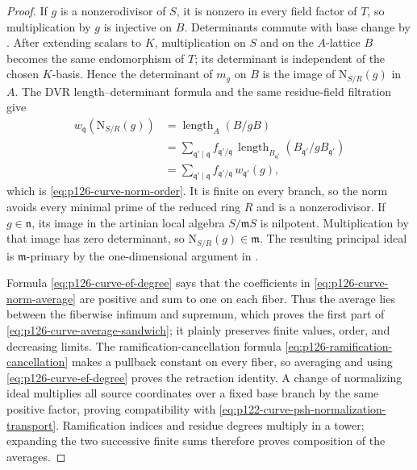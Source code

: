\begin{proof}
If \(g\) is a nonzerodivisor of \(S\), it is nonzero in every field factor
of \(T\), so multiplication by \(g\) is injective on \(B\).  Determinants
commute with base change by .  After
extending scalars to \(K\), multiplication on \(S\) and on the
\(A\)-lattice \(B\) becomes the same endomorphism of \(T\); its determinant
is independent of the chosen \(K\)-basis.  Hence the determinant of
\(m_g\) on \(B\) is the image of \(\mathrm N_{S/R}(g)\) in \(A\).  The DVR length--determinant formula
\cite[\emph{Lengths and determinants}, Tag~02QA]{stacks-project} and the
same residue-field filtration give
\[
 \begin{aligned}
 w_{\mathfrak q}\!\left(\mathrm N_{S/R}(g)\right)
   &=\operatorname{length}_A(B/gB)\\
   &=\sum_{\mathfrak q'\mid\mathfrak q}
       f_{\mathfrak q'/\mathfrak q}\,
       \operatorname{length}_{B_{\mathfrak q'}}
          (B_{\mathfrak q'}/gB_{\mathfrak q'})\\
   &=\sum_{\mathfrak q'\mid\mathfrak q}
       f_{\mathfrak q'/\mathfrak q}\,
       w_{\mathfrak q'}(g),
 \end{aligned}
\]
which is \eqref{eq:p126-curve-norm-order}.  It is finite on every branch,
so the norm avoids every minimal prime of the reduced ring \(R\) and is a
nonzerodivisor.  If \(g\in\mathfrak n\), its image in the artinian local
algebra \(S/\mathfrak mS\) is nilpotent.  Multiplication by that image has
zero determinant, so \(\mathrm N_{S/R}(g)\in\mathfrak m\).  The resulting
principal ideal is \(\mathfrak m\)-primary by the one-dimensional argument
in .

Formula \eqref{eq:p126-curve-ef-degree} says that the coefficients in
\eqref{eq:p126-curve-norm-average} are positive and sum to one on each
fiber.  Thus the average lies between the fiberwise infimum and supremum,
which proves the first part of
\eqref{eq:p126-curve-average-sandwich}; it plainly preserves finite values,
order, and decreasing limits.  The ramification-cancellation formula
\eqref{eq:p126-ramification-cancellation} makes a pullback constant on every
fiber, so averaging and using \eqref{eq:p126-curve-ef-degree} proves the
retraction identity.  A change of normalizing ideal multiplies all source
coordinates over a fixed base branch by the same positive factor, proving
compatibility with \eqref{eq:p122-curve-psh-normalization-transport}.
Ramification indices and residue degrees multiply in a tower; expanding the
two successive finite sums therefore proves composition of the averages.


\end{proof}
